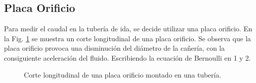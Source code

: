 \subsection{Placa Orificio}
\label{subsec:PlacaOrificio}
Para medir el caudal en la tubería de ida, se decide
utilizar una placa orificio.
En la Fig. \ref{fig:placaOrificio} se muestra un corte longitudinal de una placa
orificio.
Se observa que la placa orificio provoca una disminución del diámetro
de la cañería, con la consiguiente aceleración del fluido.
Escribiendo la ecuación de Bernoulli en 1 y 2.

\begin{figure}
 \centering
 \caption{Corte longitudinal de una placa orificio montado en una tubería.}
 \label{fig:placaOrificio}
\end{figure}

